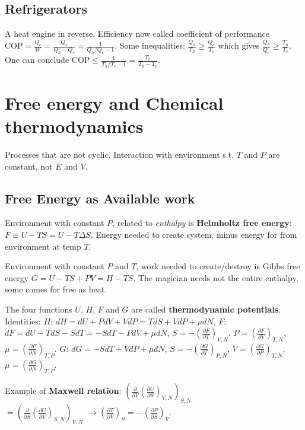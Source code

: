\documentclass[11pt,twocolumn]{amsart}
\begin{document}
\subsection{Refrigerators} A heat engine in reverse. Efficiency now called coefficient of performance $\text{COP}=\frac{Q_c}{W}=\frac{Q_c}{Q_h-Q_c} = \frac{1}{Q_h/Q_c -1}$. Some inequalities: $\frac{Q_h}{T_h} \geq \frac{Q_c}{T_c}$ which gives $\frac{Q_h}{Q_c} \geq \frac{T_h}{T_c}$. One can conclude $\text{COP} \leq \frac{1}{T_h/T_c -1} =\frac{T_c}{T_h - T_c}$.

\section{Free energy and Chemical thermodynamics}
Processes that are not cyclic. Interaction with environment s.t. $T$ and $P$ are constant, not $E$ and $V$.

\subsection{Free Energy as Available work}
Environment with constant $P$, related to \emph{enthalpy} is \textbf{Helmholtz free energy}: $F \equiv U - TS = U - T\Delta S$. Energy needed to create system, minus energy for from environment at temp $T$. 

Environment with constant $P$ and $T$, work needed to create/destroy is Gibbs free energy $G = U - TS + PV = H - TS$. The magician needs not the entire enthalpy, some comes for free as heat.

The four functions $U$, $H$, $F$ and $G$ are called \textbf{thermodynamic potentials}. Identities: $H$: $dH = dU + PdV + VdP = TdS + VdP + \mu dN$, $F$: $dF = dU - TdS - SdT = -SdT - PdV + \mu dN$, $S = -\left(\frac{\partial F}{\partial T} \right)_{V,N}$, $P = \left(\frac{\partial F}{\partial V} \right)_{T,N} $, $\mu = \left( \frac{\partial F}{\partial  N} \right)_{T,P} $. $G$: $dG = -SdT + VdP + \mu dN $, $S = - \left(\frac{\partial G}{\partial T} \right)_{P,N}$, $V = \left(\frac{\partial G}{\partial P} \right)_{T,N}$, $\mu = \left(\frac{\partial G}{\partial N} \right)_{T,P}$.

Example of \textbf{Maxwell relation}: $\left(\frac{\partial}{\partial V}\left(\frac{\partial U}{\partial S} \right)_{V,N} \right)_{S,N}$\\ $= \left(\frac{\partial}{\partial S}\left(\frac{\partial U}{\partial V} \right)_{S,N} \right)_{V,N}$ $\rightarrow \left(\frac{\partial T}{\partial V} \right)_S = - \left(\frac{\partial P}{\partial S} \right)_V$.
\end{document}
